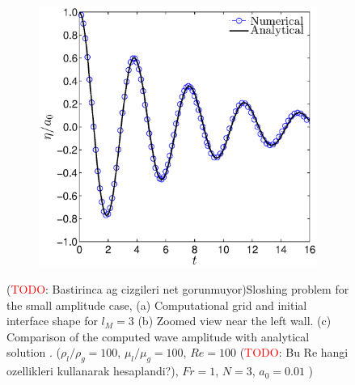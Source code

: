 \documentclass[11pt,a4paper,twoside]{article}
\begin{document}
\begin{figure}[ht!]
\begin{center}
\begin{subfigure}[]{0.25\textwidth}
				\caption{}
			\end{subfigure}
			~
			\begin{subfigure}[]{0.45\textwidth}
				\includegraphics[width=\textwidth]{StandingVaweAmplitudeExact.eps}
				\caption{}
			\end{subfigure}
		\end{center}
		\caption{(\textcolor{red}{TODO}: Bastirinca ag cizgileri net gorunmuyor)Sloshing problem for the small amplitude case, (a) Computational grid and  initial interface shape for $ l_{M} = 3 $ (b) Zoomed view  near the left wall. (c) Comparison of the computed wave amplitude with analytical solution \cite{wu_effect_2001}. ($ \rho_l/\rho_g  = 100$, $ \mu_l/\mu_g  = 100$,  $ Re = 100 $ (\textcolor{red}{TODO}: Bu Re hangi ozellikleri kullanarak hesaplandi?),  $ Fr = 1 $, $ N=3 $, $ a_0 = 0.01 $ )}
		\label{Fig:StandingWaveMeshSmall}
	\end{figure}
	
\end{document}
